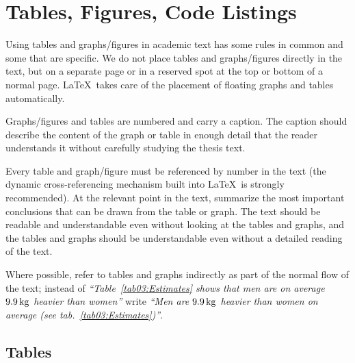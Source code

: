 
\chapter{Tables, Figures, Code Listings}

Using tables and graphs/figures in academic text has some rules in common and some that are specific. We do not place tables and graphs/figures directly in the text, but on a separate page or in a reserved spot at the top or bottom of a normal page. \LaTeX\ takes care of the placement of floating graphs and tables automatically.

Graphs/figures and tables are numbered and carry a caption. The caption should describe the content of the graph or table in enough detail that the reader understands it without carefully studying the thesis text.

Every table and graph/figure must be referenced by number in the text (the dynamic cross-referencing mechanism built into \LaTeX\ is strongly recommended). At the relevant point in the text, summarize the most important conclusions that can be drawn from the table or graph. The text should be readable and understandable even without looking at the tables and graphs, and the tables and graphs should be understandable even without a detailed reading of the text.

Where possible, refer to tables and graphs indirectly as part of the normal flow of the text; instead of \emph{\enquote{Table~\ref{tab03:Estimates} shows that
    men are on average $9.9\,\rm kg$ heavier than women}} write
\emph{\enquote{Men are $9.9\,\rm kg$ heavier than women on average (see
    tab.~\ref{tab03:Estimates})}}.

\section{Tables}

